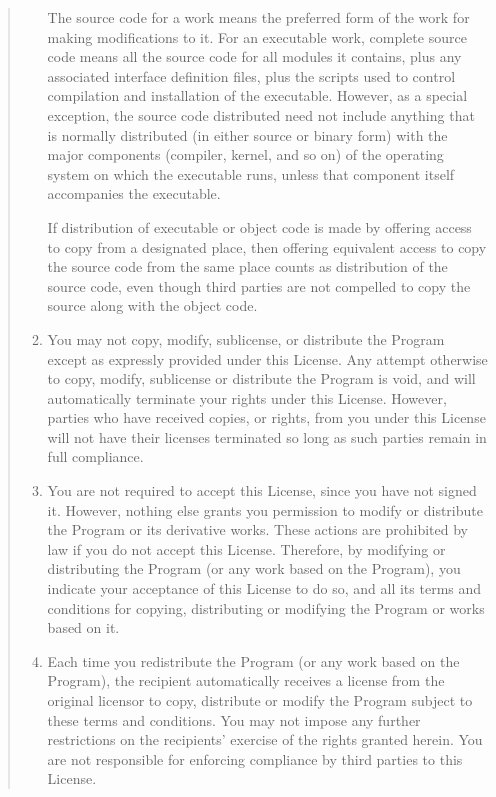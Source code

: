 \documentclass[twoside,11pt]{article}
\renewcommand{\_}{\texttt{\symbol{95}}}
\begin{document}
\begin{quote}
\begin{enumerate}
\begin{enumerate}
\end{enumerate}


The source code for a work means the preferred form of the work for
making modifications to it.  For an executable work, complete source
code means all the source code for all modules it contains, plus any
associated interface definition files, plus the scripts used to
control compilation and installation of the executable.  However, as a
special exception, the source code distributed need not include
anything that is normally distributed (in either source or binary
form) with the major components (compiler, kernel, and so on) of the
operating system on which the executable runs, unless that component
itself accompanies the executable.

If distribution of executable or object code is made by offering
access to copy from a designated place, then offering equivalent
access to copy the source code from the same place counts as
distribution of the source code, even though third parties are not
compelled to copy the source along with the object code.

\item
You may not copy, modify, sublicense, or distribute the Program
except as expressly provided under this License.  Any attempt
otherwise to copy, modify, sublicense or distribute the Program is
void, and will automatically terminate your rights under this License.
However, parties who have received copies, or rights, from you under
this License will not have their licenses terminated so long as such
parties remain in full compliance.

\item
You are not required to accept this License, since you have not
signed it.  However, nothing else grants you permission to modify or
distribute the Program or its derivative works.  These actions are
prohibited by law if you do not accept this License.  Therefore, by
modifying or distributing the Program (or any work based on the
Program), you indicate your acceptance of this License to do so, and
all its terms and conditions for copying, distributing or modifying
the Program or works based on it.

\item
Each time you redistribute the Program (or any work based on the
Program), the recipient automatically receives a license from the
original licensor to copy, distribute or modify the Program subject to
these terms and conditions.  You may not impose any further
restrictions on the recipients' exercise of the rights granted herein.
You are not responsible for enforcing compliance by third parties to
this License.


\end{enumerate}
\end{quote}
\end{document}
